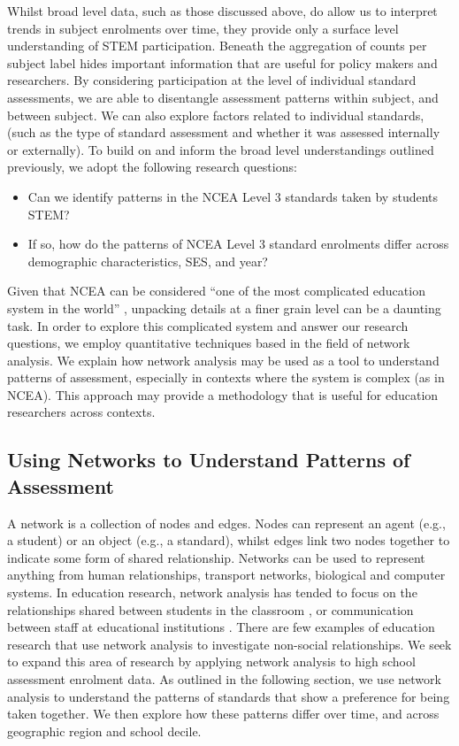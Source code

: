 Whilst broad level data, such as those discussed above, do allow us to interpret trends in subject enrolments over time, they provide only a surface level understanding of STEM participation. Beneath the aggregation of counts per subject label hides important information that are useful for policy makers and researchers. By considering participation at the level of individual standard assessments, we are able to disentangle assessment patterns within subject, and between subject. We can also explore factors related to individual standards, (such as the type of standard assessment and whether it was assessed internally or externally). To build on and inform the broad level understandings outlined previously, we adopt the following research questions:
\begin{itemize}
    \item Can we identify patterns in the NCEA Level 3 standards  taken by students STEM?
    \item If so, how do the patterns of NCEA Level 3 standard enrolments differ across demographic characteristics, SES, and year?
\end{itemize}

Given that NCEA can be considered ``one of the most complicated education system in the world'' \citep{hipkins2016ncea}, unpacking details at a finer grain level can be a daunting task. In order to explore this complicated system and answer our research questions, we employ quantitative techniques based in the field of network analysis. We explain how network analysis may be used as a tool to understand patterns of assessment, especially in contexts where the system is complex (as in NCEA).  This approach may provide a methodology that is useful for education researchers across contexts. 


\subsection{Using Networks to Understand Patterns of Assessment}
A network is a collection of nodes and edges. Nodes can represent an agent (e.g., a student) or an object (e.g., a standard), whilst edges link two nodes together to indicate some form of shared relationship. Networks can be used to represent anything from human relationships, transport networks, biological and computer systems. In education research, network analysis has tended to focus on the relationships shared between students in the classroom \citep{tranmer2014multiple}, or communication between staff at educational institutions \citep{daly2010social}. There are few examples of education research that use network analysis to investigate non-social relationships. We seek to expand this area of research by applying network analysis to high school assessment enrolment data. As outlined in the following section, we use network analysis to understand the patterns of standards that show a preference for being taken together. We then explore how these patterns differ over time, and across geographic region and school decile.

